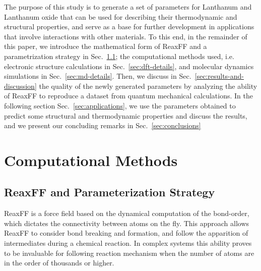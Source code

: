\documentclass[journal=jpcafh,manuscript=article]{achemso}
\begin{document}
The purpose of this study is to generate a set of parameters for Lanthanum and Lanthanum oxide that can be used for describing their thermodynamic and structural properties, and serve as a base for further development in applications that involve interactions with other materials.
To this end, in the remainder of this paper, we introduce the mathematical form of ReaxFF and a parametrization strategy in Sec.~\ref{sec:reaxff-strategy}; the computational methods used, i.e. electronic structure calculations in Sec.~\ref{sec:dft-details}, and molecular dynamics simulations in Sec.~\ref{sec:md-details}.
Then, we discuss in Sec.~\ref{sec:results-and-discussion} the quality of the newly generated parameters by analyzing the ability of ReaxFF to reproduce a dataset from quantum mechanical calculations.
In the following section Sec.~\ref{sec:applications}, we use the parameters obtained to predict some structural and thermodynamic properties and discuss the results, and we present our concluding remarks in Sec.~\ref{sec:conclusions}

%
%

\section{Computational Methods}

\subsection{ReaxFF and Parameterization Strategy}
\label{sec:reaxff-strategy}

ReaxFF is a force field based on the dynamical computation of the bond-order, which dictates the connectivity between atoms on the fly.
This approach allows ReaxFF to consider bond breaking and formation, and follow the apparition of intermediates during a chemical reaction.
In complex systems this ability proves to be invaluable for following reaction mechanism when the number of atoms are in the order of thousands or higher.\cite{migliorati_development_2017,merinov_reaxff_2014,
raymand_reactive_2008,
shin_development_2015,
van_duin_reaxff_2008,
goddard_development_2006,
hubin_parameterization_2016,
senftle_reaxff_2016,
chenoweth_reaxff_2009,
chenoweth_reaxff_2008,
van_duin_reaxff_2008-1,
liu_reaxff-lg:_2011}
\end{document}
